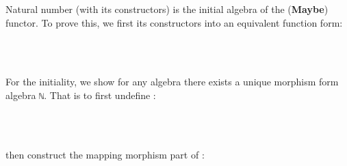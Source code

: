 Natural number (with its constructors) is the initial algebra of the  (\textbf{Maybe}) functor. To prove this, we first its constructors into an equivalent function form:
\begin{code}%
\>[0]\AgdaFunction{[z,s]}\AgdaSpace{}%
\AgdaSymbol{:}\AgdaSpace{}%
\AgdaSpace{}%
\AgdaSpace{}%
\AgdaSpace{}%
\AgdaSpace{}%
\<%
\\
\>[0]\AgdaFunction{[z,s]}\AgdaSpace{}%
\AgdaSymbol{(}\AgdaSpace{}%
\AgdaSymbol{)}\AgdaSpace{}%
\AgdaSymbol{=}\AgdaSpace{}%
\<%
\\
\>[0]\AgdaFunction{[z,s]}\AgdaSpace{}%
\AgdaSymbol{(}\AgdaSpace{}%
\AgdaSymbol{)}\AgdaSpace{}%
\AgdaSymbol{=}\AgdaSpace{}%
\AgdaSpace{}%
\<%
\end{code}

For the initiality, we show for any algebra there exists a unique morphism form algebra \texttt{ℕ}. That is to first undefine :

\begin{code}%
\>[0]\AgdaSpace{}%
\AgdaSymbol{:}\AgdaSpace{}%
\AgdaSymbol{(}\AgdaSpace{}%
\AgdaSpace{}%
\AgdaSpace{}%
\AgdaSpace{}%
\AgdaSymbol{)}\AgdaSpace{}%
\AgdaSpace{}%
\AgdaSpace{}%
\AgdaSpace{}%
\<%
\\
\>[0]\AgdaSpace{}%
\AgdaSpace{}%
\AgdaSpace{}%
\AgdaSymbol{=}\AgdaSpace{}%
\AgdaSpace{}%
\AgdaSymbol{(}\AgdaSpace{}%
\AgdaSymbol{)}\<%
\\
\>[0]\AgdaSpace{}%
\AgdaSpace{}%
\AgdaSymbol{(}\AgdaSpace{}%
\AgdaSymbol{)}\AgdaSpace{}%
\AgdaSymbol{=}\AgdaSpace{}%
\AgdaSpace{}%
\AgdaSymbol{(}\AgdaSpace{}%
\AgdaSymbol{(}\AgdaSpace{}%
\AgdaSpace{}%
\AgdaSymbol{))}\<%
\end{code}

then construct the mapping morphism part of :

